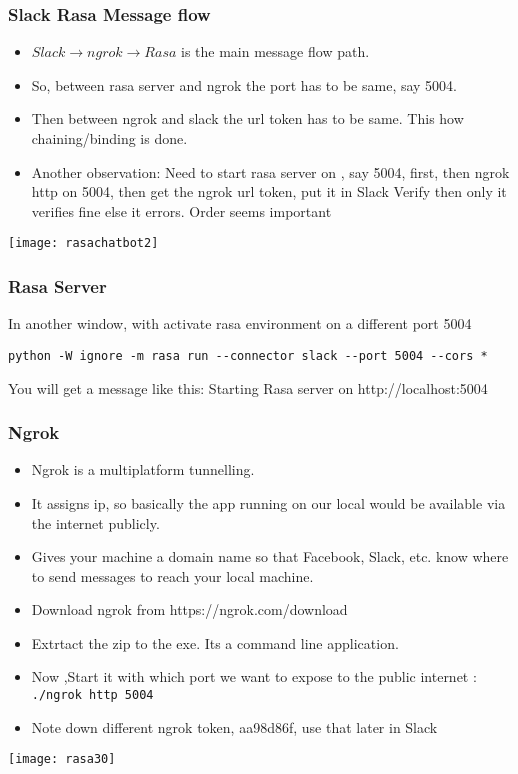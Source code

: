 \begin{frame}[fragile]\frametitle{Slack Rasa Message flow}
\begin{itemize}
\item $Slack \rightarrow ngrok \rightarrow Rasa$ is the main message flow path. 
\item So, between rasa server and ngrok the port has to be same, say 5004. 
\item Then between ngrok and slack the url token has to be same. This how chaining/binding is done.
\item Another observation: Need to start rasa server on , say 5004, first, then ngrok http on 5004, then get the ngrok url token, put it in Slack Verify then only it verifies fine else it errors. Order seems important
\end{itemize}

\begin{center}
\texttt{[image: rasachatbot2]}
\end{center}
\end{frame}

\begin{frame}[fragile]\frametitle{Rasa Server}
In another window, with activate rasa environment on a different port 5004

\begin{lstlisting}
python -W ignore -m rasa run --connector slack --port 5004 --cors *
\end{lstlisting}
You will get a message like this:  Starting Rasa server on http://localhost:5004

\end{frame}


\begin{frame}[fragile]\frametitle{Ngrok}
\begin{itemize}
\item Ngrok is a multiplatform tunnelling. 
\item It assigns ip, so basically the app running on our local would be available via the internet publicly.
\item Gives your machine a domain name so that Facebook, Slack, etc. know where to send messages to reach your local machine.
\item Download ngrok from https://ngrok.com/download 	
\item Extrtact the zip to the exe. Its a command line application.
\item Now ,Start it with which port we want to expose to the public internet : \lstinline| ./ngrok http 5004|
\item Note down different ngrok token, aa98d86f, use that later in Slack
\end{itemize}

\begin{center}
\texttt{[image: rasa30]}
\end{center}
\end{frame}

